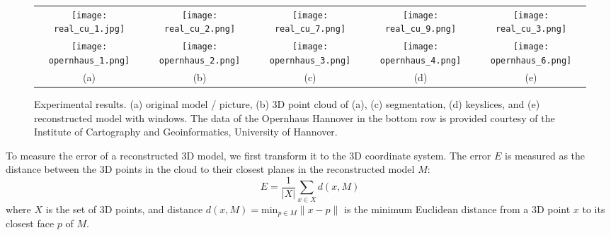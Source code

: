 \documentclass[10pt, conference, compsocconf]{IEEEtran}
\begin{document}
\begin{figure*}[htbp]
\begin{center}
\begin{tabular}{ccccc}
\texttt{[image: real\_cu\_1.jpg]} &
\texttt{[image: real\_cu\_2.png]} &
\texttt{[image: real\_cu\_7.png]} &
\texttt{[image: real\_cu\_9.png]} &
\texttt{[image: real\_cu\_3.png]} \\
\texttt{[image: opernhaus\_1.png]} &
\texttt{[image: opernhaus\_2.png]} &
\texttt{[image: opernhaus\_3.png]} &
\texttt{[image: opernhaus\_4.png]} &
\texttt{[image: opernhaus\_6.png]} \\
(a) & (b) & (c) & (d) & (e)
\end{tabular}
\end{center}
\caption{Experimental results.
(a) original model / picture,
(b) 3D point cloud of (a),
(c) segmentation,
(d) keyslices, and
(e) reconstructed model with windows.
The data of the Opernhaus Hannover in the bottom row is provided courtesy of 
the Institute of Cartography and Geoinformatics, University of Hannover.
}
\label{fig:results}
\end{figure*}

%
To measure the error of a reconstructed 3D model, we first transform it
to the 3D coordinate system.
The error $E$ is measured as the distance between the 3D points in the cloud
to their closest planes in the reconstructed model $M$:
\begin{equation}
E = \frac{1}{|X|}\sum_{x\in{X}}{d(x, M)}
\label{eq:em}
\end{equation}
where $X$ is the set of 3D points, and distance
$d(x, M) = \text{min}_{p \in M}\lVert x - p \lVert$ is the minimum
Euclidean distance from a 3D point $x$ to its closest face $p$ of $M$.
\end{document}
